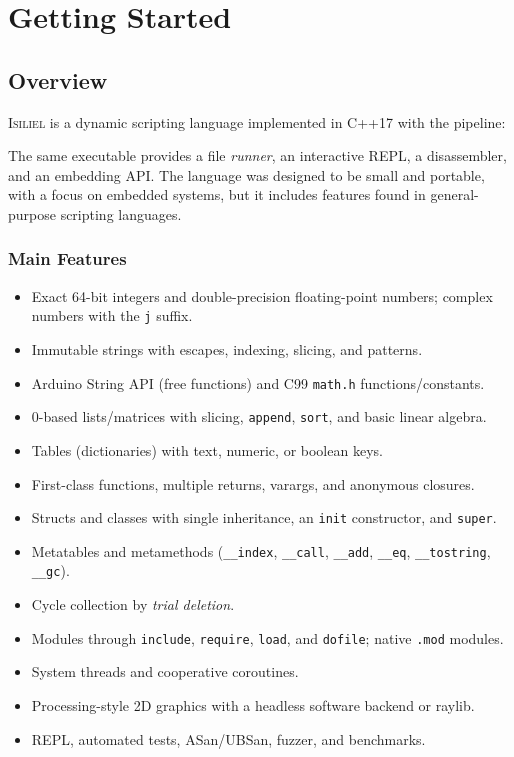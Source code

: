 \documentclass[11pt,a4paper,oneside]{report}
\newcommand{\isiliel}{\textsc{Isiliel}}
\newcommand{\code}[1]{\texttt{#1}}
\newcommand{\file}[1]{\texttt{#1}}
\begin{document}
\part{Getting Started}

\chapter{Overview}
\label{cap:visao}

\isiliel{} is a dynamic scripting language implemented in C++17 with the
pipeline:

\begin{center}
\end{center}

The same executable provides a file \emph{runner}, an interactive REPL,
a disassembler, and an embedding API. The language was designed to be
small and portable, with a focus on embedded systems, but it includes
features found in general-purpose scripting languages.

\section{Main Features}
\begin{itemize}
  \item Exact 64-bit integers and double-precision floating-point
        numbers; complex numbers with the \code{j} suffix.
  \item Immutable strings with escapes, indexing, slicing, and patterns.
  \item Arduino String API (free functions) and C99 \file{math.h}
        functions/constants.
  \item 0-based lists/matrices with slicing, \code{append}, \code{sort},
        and basic linear algebra.
  \item Tables (dictionaries) with text, numeric, or boolean keys.
  \item First-class functions, multiple returns, varargs, and anonymous
        closures.
  \item Structs and classes with single inheritance, an \code{init}
        constructor, and \code{super}.
  \item Metatables and metamethods (\code{\_\_index}, \code{\_\_call},
        \code{\_\_add}, \code{\_\_eq}, \code{\_\_tostring}, \code{\_\_gc}).
  \item Cycle collection by \emph{trial deletion}.
  \item Modules through \code{include}, \code{require}, \code{load}, and
        \code{dofile}; native \code{.mod} modules.
  \item System threads and cooperative coroutines.
  \item Processing-style 2D graphics with a headless software backend or
        raylib.
  \item REPL, automated tests, ASan/UBSan, fuzzer, and benchmarks.
\end{itemize}
\end{document}
